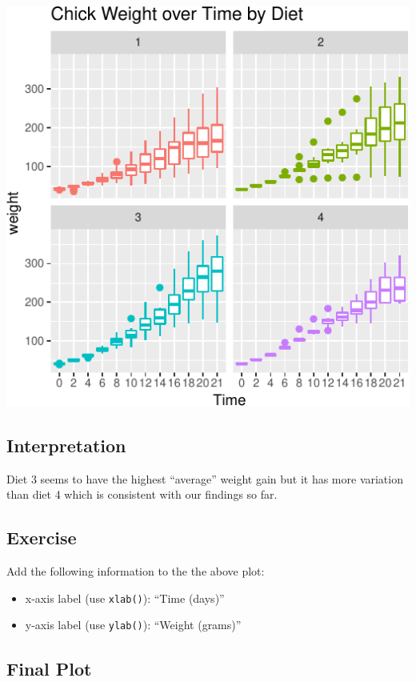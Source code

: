 \documentclass[a4paper,9pt,twocolumn,twoside,printwatermark=false]{pinp}
\providecommand{\tightlist}{%
  \setlength{\itemsep}{0pt}\setlength{\parskip}{0pt}}
\begin{document}
\begin{center}\includegraphics{Getting-Started-in-R_files/figure-latex/boxPlot-1} \end{center}

\subsection{Interpretation}\label{interpretation-4}

Diet 3 seems to have the highest ``average'' weight gain but it has more
variation than diet 4 which is consistent with our findings so far.

\subsection{Exercise}\label{exercise-8}

Add the following information to the the above plot:

\begin{itemize}
\tightlist
\item
  x-axis label (use \texttt{xlab()}): ``Time (days)''
\item
  y-axis label (use \texttt{ylab()}): ``Weight (grams)''
\end{itemize}

\subsection{Final Plot}\label{final-plot}
\end{document}
